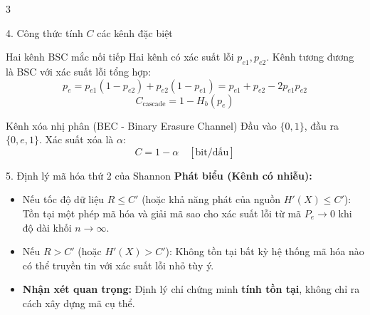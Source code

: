 \documentclass[10pt,landscape,a4paper]{article}
\begin{document}
\begin{multicols*}{3}
\begin{cheatbox}{4. Công thức tính $C$ các kênh đặc biệt}
\begin{subbox}{Hai kênh BSC mắc nối tiếp}
Hai kênh có xác suất lỗi $p_{e1}, p_{e2}$. Kênh tương đương là BSC với xác suất lỗi tổng hợp:
\[ p_e = p_{e1}(1 - p_{e2}) + p_{e2}(1 - p_{e1}) = p_{e1} + p_{e2} - 2p_{e1}p_{e2} \]
\[ C_{\text{cascade}} = 1 - H_b(p_e) \]
\end{subbox}

\begin{subbox}{Kênh xóa nhị phân (BEC - Binary Erasure Channel)}
Đầu vào $\{0, 1\}$, đầu ra $\{0, e, 1\}$. Xác suất xóa là $\alpha$:
\[ C = 1 - \alpha \quad [\text{bit/dấu}] \]
\end{subbox}
\end{cheatbox}

\begin{cheatbox}{5. Định lý mã hóa thứ 2 của Shannon}
\textbf{Phát biểu (Kênh có nhiễu):}
\begin{itemize}[leftmargin=*,noitemsep]
    \item Nếu tốc độ dữ liệu $R \le C'$ (hoặc khả năng phát của nguồn $H'(X) \le C'$):
    Tồn tại một phép mã hóa và giải mã sao cho xác suất lỗi từ mã $P_e \to 0$ khi độ dài khối $n \to \infty$.
    \item Nếu $R > C'$ (hoặc $H'(X) > C'$):
    Không tồn tại bất kỳ hệ thống mã hóa nào có thể truyền tin với xác suất lỗi nhỏ tùy ý.
    \item \textbf{Nhận xét quan trọng:} Định lý chỉ chứng minh \textbf{tính tồn tại}, không chỉ ra cách xây dựng mã cụ thể.
\end{itemize}
\end{cheatbox}


\end{multicols*}
\end{document}
